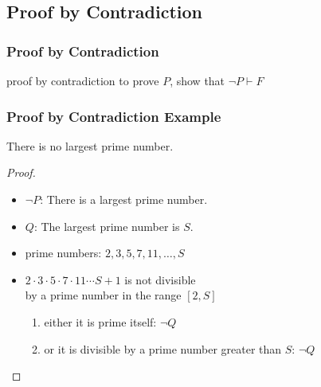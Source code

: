 \documentclass[dvipsnames]{beamer}
\begin{document}
\subsection{Proof by Contradiction}

\begin{frame}
  \frametitle{Proof by Contradiction}

  \begin{block}{proof by contradiction}
    to prove $P$, show that $\neg P \vdash F$
  \end{block}
\end{frame}

\begin{frame}
  \frametitle{Proof by Contradiction Example}

  \begin{theorem}
    There is no largest prime number.
  \end{theorem}

  \pause
  \begin{proof}
    \begin{itemize}
      \item $\neg P$: There is a largest prime number.

      \pause
      \item $Q$: The largest prime number is $S$.

      \pause
      \item prime numbers: $2,3,5,7,11,\dots,S$

      \pause
      \item $2 \cdot 3 \cdot 5 \cdot 7 \cdot 11 \cdots S + 1$ is not divisible\\
        by a prime number in the range $[2, S]$
      \pause
      \begin{enumerate}
        \item either it is prime itself: $\neg Q$

        \pause
        \item or it is divisible by a prime number greater than $S$: $\neg Q$
      \end{enumerate}
    \end{itemize}
  \end{proof}
\end{frame}
\end{document}
